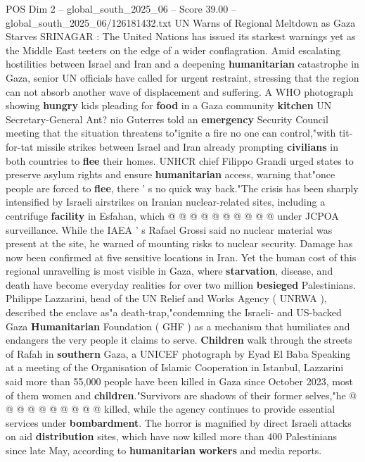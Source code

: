 \begin{textsample}{POS Dim 2 – global\_south\_2025\_06 – Score 39.00 – global\_south\_2025\_06/126181432.txt}  \label{ex:f2_pos_081}
UN Warns of Regional Meltdown as Gaza Starves SRINAGAR : The United Nations has issued its starkest warnings yet as the Middle East teeters on the edge of a wider conflagration.
Amid escalating hostilities between Israel and Iran and a deepening \textbf{humanitarian} catastrophe in Gaza, senior UN officials have called for urgent restraint, stressing that the region can not absorb another wave of displacement and suffering.
A WHO photograph showing \textbf{hungry} kids pleading for \textbf{food} in a Gaza community \textbf{kitchen} UN Secretary-General Ant? nio Guterres told an \textbf{emergency} Security Council meeting that the situation threatens to"ignite a fire no one can control,"with tit-for-tat missile strikes between Israel and Iran already prompting \textbf{civilians} in both countries to \textbf{flee} their homes.
UNHCR chief Filippo Grandi urged states to preserve asylum rights and ensure \textbf{humanitarian} access, warning that"once people are forced to \textbf{flee}, there ' s no quick way back."The crisis has been sharply intensified by Israeli airstrikes on Iranian nuclear-related sites, including a centrifuge \textbf{facility} in Esfahan, which @ @ @ @ @ @ @ @ @ @ under JCPOA surveillance.
While the IAEA ' s Rafael Grossi said no nuclear material was present at the site, he warned of mounting risks to nuclear security.
Damage has now been confirmed at five sensitive locations in Iran.
Yet the human cost of this regional unravelling is most visible in Gaza, where \textbf{starvation}, disease, and death have become everyday realities for over two million \textbf{besieged} Palestinians.
Philippe Lazzarini, head of the UN Relief and Works Agency ( UNRWA ), described the enclave as"a death-trap,"condemning the Israeli- and US-backed Gaza \textbf{Humanitarian} Foundation ( GHF ) as a mechanism that humiliates and endangers the very people it claims to serve. \textbf{Children} walk through the streets of Rafah in \textbf{southern} Gaza, a UNICEF photograph by Eyad El Baba Speaking at a meeting of the Organisation of Islamic Cooperation in Istanbul, Lazzarini said more than 55,000 people have been killed in Gaza since October 2023, most of them women and \textbf{children}."Survivors are shadows of their former selves,"he @ @ @ @ @ @ @ @ @ @ killed, while the agency continues to provide essential services under \textbf{bombardment}.
The horror is magnified by direct Israeli attacks on aid \textbf{distribution} sites, which have now killed more than 400 Palestinians since late May, according to \textbf{humanitarian} \textbf{workers} and media reports.

\end{textsample}

